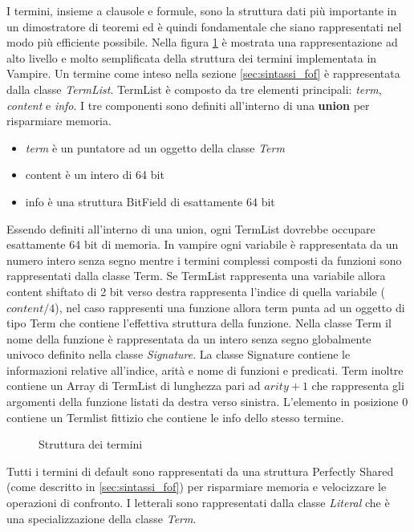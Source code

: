 \documentclass[./main.tex]{subfiles}
\begin{document}
I termini, insieme a clausole e formule, sono la struttura dati più importante in un dimostratore di teoremi ed è quindi fondamentale
che siano rappresentati nel modo più efficiente possibile. 
Nella figura \ref{fig:vampire_terms} è mostrata una rappresentazione ad alto 
livello e molto semplificata della struttura dei termini implementata in Vampire.
Un termine come inteso nella sezione \ref{sec:sintassi_fof} è rappresentata dalla classe \textit{TermList}.
TermList è composto da tre elementi principali: \textit{term}, \textit{content} e \textit{info}.
I tre componenti sono definiti all'interno di una \textbf{union} per risparmiare memoria.
\begin{itemize}
    \item \textit{term} è un puntatore ad un oggetto della classe \textit{Term}
    \item content è un intero di 64 bit
    \item info è una struttura BitField di esattamente 64 bit
\end{itemize}
Essendo definiti all'interno di una union, ogni TermList dovrebbe occupare esattamente 64 bit di memoria.
In vampire ogni variabile è rappresentata da un numero intero senza segno mentre i termini complessi
composti da funzioni sono rappresentati dalla classe Term. 
Se TermList rappresenta una variabile allora content shiftato di 2 bit verso destra rappresenta l'indice di quella variabile ($content/4$),
nel caso rappresenti una funzione allora term punta ad un oggetto di tipo Term che contiene l'effettiva struttura della funzione.
Nella classe Term il nome della funzione è rappresentata da un intero senza segno globalmente univoco definito nella classe \textit{Signature}.
La classe Signature contiene le informazioni relative all'indice, arità e nome di funzioni e predicati. 
Term inoltre contiene un Array di TermList di lunghezza pari ad $arity+1$ che rappresenta gli argomenti della funzione listati 
da destra verso sinistra. L'elemento in posizione 0 contiene un Termlist fittizio che contiene le info dello stesso termine.
\begin{figure}[H]
    \centering
    \scalebox{0.55}{
        
    }
    \caption{Struttura dei termini}
    \label{fig:vampire_terms}
\end{figure}
Tutti i termini di default sono rappresentati da una struttura Perfectly Shared (come descritto in \ref{sec:sintassi_fof}) per 
risparmiare memoria e velocizzare le operazioni di confronto.
I letterali sono rappresentati dalla classe \textit{Literal} che è una specializzazione della classe \textit{Term}.
\end{document}

